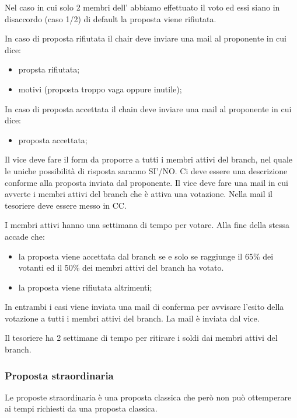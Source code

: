 Nel caso in cui solo 2 membri dell'\EC{} abbiamo effettuato il voto ed essi siano in disaccordo (caso 1/2) di default la proposta viene rifiutata.

In caso di proposta rifiutata il chair deve inviare una mail al proponente in cui dice:
\begin{itemize}
	\item propsta rifiutata;
	\item motivi (proposta troppo vaga oppure inutile);
\end{itemize}

In caso di proposta accettata il chain deve inviare una mail al proponente in cui dice:
\begin{itemize}
	\item proposta accettata;
\end{itemize}

Il vice deve fare il form da proporre a tutti i membri attivi del branch, nel quale le uniche possibilità di risposta saranno SI'/NO. Ci deve essere una descrizione conforme alla proposta inviata dal proponente. 
Il vice deve fare una mail in cui avverte i membri attivi del branch che è attiva una votazione. Nella mail il tesoriere deve essere messo in CC.

I membri attivi hanno una settimana di tempo per votare. Alla fine della stessa accade che:

\begin{itemize}
	\item la proposta viene accettata dal branch se e solo se raggiunge il 65\% dei votanti ed il 50\% dei membri attivi del branch ha votato.
	\item la proposta viene rifiutata altrimenti;
\end{itemize}

In entrambi i casi viene inviata una mail di conferma per  avvisare l'esito della votazione a tutti i membri attivi del branch. La mail è inviata dal vice.

Il tesoriere ha 2 settimane di tempo per ritirare i soldi dai membri attivi del branch.

\subsubsection{Proposta straordinaria}

Le proposte straordinaria è una proposta classica che però non può ottemperare ai tempi richiesti da una proposta classica.

